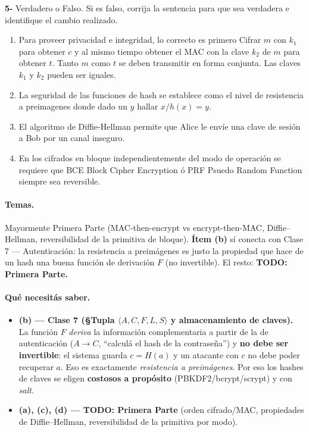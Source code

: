 \begin{consigna}
\textbf{5-} Verdadero o Falso. Si es falso, corrija la sentencia para que sea verdadera e
identifique el cambio realizado.
\begin{enumerate}
\item[a)] Para proveer privacidad e integridad, lo correcto es primero Cifrar $m$ con $k_1$ para obtener $c$ y al mismo tiempo obtener el MAC con la clave $k_2$ de $m$ para obtener $t$. Tanto $m$ como $t$ se deben transmitir en forma conjunta. Las claves $k_1$ y $k_2$ pueden ser iguales.
\item[b)] La seguridad de las funciones de hash se establece como el nivel de resistencia a preimagenes donde dado un $y$ hallar $x/h(x)=y$.
\item[c)] El algoritmo de Diffie-Hellman permite que Alice le envíe una clave de sesión a Bob por un canal inseguro.
\item[d)] En los cifrados en bloque independientemente del modo de operación se requiere que BCE Block Cipher Encryption ó PRF Psuedo Random Function siempre sea reversible.
\end{enumerate}
\end{consigna}

\paragraph{Temas.}
Mayormente Primera Parte (MAC-then-encrypt vs encrypt-then-MAC, Diffie--Hellman, reversibilidad de
la primitiva de bloque). \textbf{Ítem (b)} sí conecta con Clase 7 — Autenticación: la resistencia
a preimágenes es justo la propiedad que hace de un hash una buena función de derivación $F$ (no
invertible). El resto: \textbf{TODO: Primera Parte.}

\paragraph{Qué necesitás saber.}
\begin{itemize}
\item \textbf{(b) — Clase 7 (\S Tupla $\langle A,C,F,L,S\rangle$ y almacenamiento de claves).} La
      función $F$ \emph{deriva} la información complementaria a partir de la de autenticación
      ($A\to C$, ``calculá el hash de la contraseña'') y \textbf{no debe ser invertible}: el
      sistema guarda $c=H(a)$ y un atacante con $c$ no debe poder recuperar $a$. Eso es
      exactamente \emph{resistencia a preimágenes}. Por eso los hashes de claves se eligen
      \textbf{costosos a propósito} (PBKDF2/bcrypt/scrypt) y con \emph{salt}.
\item \textbf{(a), (c), (d) — TODO: Primera Parte} (orden cifrado/MAC, propiedades de
      Diffie--Hellman, reversibilidad de la primitiva por modo).
\end{itemize}

